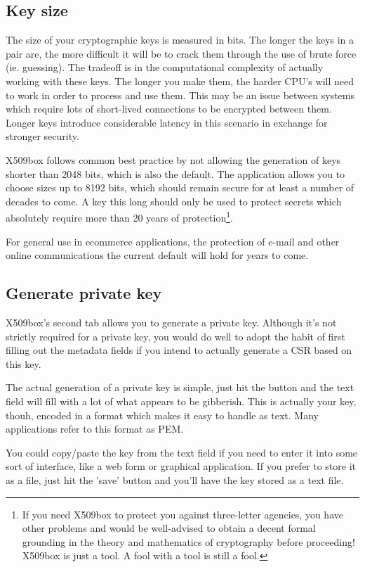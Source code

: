 \documentclass[a4paper,12pt]{article}
\begin{document}
\subsection{Key size}
The size of your cryptographic keys is measured in bits. The longer the keys in a pair are, the more difficult it will be to crack them through the use of brute force (ie. guessing). The tradeoff is in the computational complexity of actually working with these keys. The longer you make them, the harder CPU's will need to work in order to process and use them. This may be an issue between systems which require lots of short-lived connections to be encrypted between them. Longer keys introduce considerable latency in this scenario in exchange for stronger security.

X509box follows common best practice by not allowing the generation of keys shorter than 2048 bits, which is also the default. The application allows you to choose sizes up to 8192 bits, which should remain secure for at least a number of decades to come. A key this long should only be used to protect secrets which absolutely require more than 20 years of protection\footnote{If you need X509box to protect you against three-letter agencies, you have other problems and would be well-advised to obtain a decent formal grounding in the theory and mathematics of cryptography before proceeding! X509box is just a tool. A fool with a tool is still a fool.}.

For general use in ecommerce applications, the protection of e-mail and other online communications the current default will hold for years to come.

\subsection{Generate private key}
X509box's second tab allows you to generate a private key. Although it's not strictly required for a private key, you would do well to adopt the habit of first filling out the metadata fields if you intend to actually generate a CSR based on this key.

The actual generation of a private key is simple, just hit the button and the text field will fill with a lot of what appears to be gibberish. This is actually your key, thouh, encoded in a format which makes it easy to handle as text. Many applications refer to this format as PEM.

You could copy/paste the key from the text field if you need to enter it into some sort of interface, like a web form or graphical application. If you prefer to store it as a file, just hit the 'save' button and you'll have the key stored as a text file.
\end{document}

